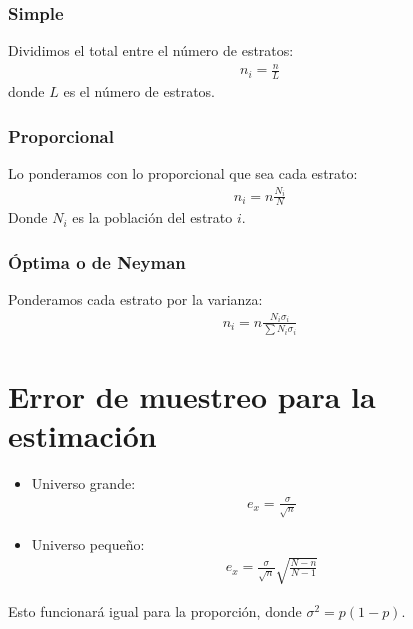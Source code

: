 \documentclass{article}
\begin{document}
\subsubsection{Simple}
Dividimos el total entre el número de estratos:
\begin{equation}
    \begin{split}
        n_{i} = \frac{n}{L}
    \end{split}
\end{equation}
donde $L$ es el número de estratos.
\subsubsection{Proporcional}
Lo ponderamos con lo proporcional que sea cada estrato:
\begin{equation}
    \begin{split}
        n_{i} = n \frac{N_{i}}{N}
    \end{split}
\end{equation}
Donde $N_{i}$ es la población del estrato $i$.
\subsubsection{Óptima o de Neyman}
Ponderamos cada estrato por la varianza:
\begin{equation}
    \begin{split}
        n_{i} = n \frac{N_{i}\sigma _{i}}{\sum N_{i}\sigma _{i}}
    \end{split}
\end{equation}
\section{Error de muestreo para la estimación}
\begin{itemize}
    \item Universo grande:
    \begin{equation}
        \begin{split}
            e_{x} = \frac{\sigma }{\sqrt{n}}
        \end{split}
    \end{equation}
    \item Universo pequeño:
    \begin{equation}
        \begin{split}
            e_{x} = \frac{\sigma }{\sqrt{n}} \sqrt{\frac{N-n}{N-1}}
        \end{split}
    \end{equation}
\end{itemize}
Esto funcionará igual para la proporción, donde $\sigma^{2} = p(1-p)$.
\end{document}
